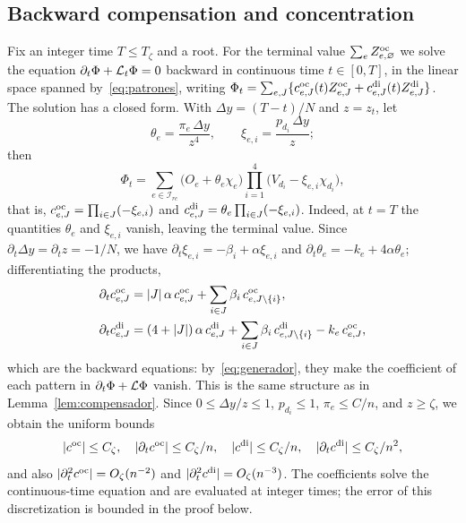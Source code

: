\subsection{Backward compensation and concentration}

Fix an integer time $T\le T_\zeta$ and a root. For the terminal value $\sum_eZ^{\mathrm{oc}}_{e,\varnothing}$ we solve
the equation
$\partial_t\Phi+\mathcal{L}_t\Phi=0$ backward in continuous time $t\in[0,T]$, in the linear space spanned
by~\eqref{eq:patrones}, writing
$\Phi_t=\sum_{e,J}\{c^{\mathrm{oc}}_{e,J}(t)Z^{\mathrm{oc}}_{e,J}+c^{\mathrm{di}}_{e,J}(t)Z^{\mathrm{di}}_{e,J}\}$. The solution has a closed form.
With $\Delta y=(T-t)/N$
and $z=z_t$, let \[
 \theta_e=\frac{\pi_e\,\Delta y}{z^4},\qquad \xi_{e,i}=\frac{p_{d_i}\,\Delta y}{z};
\] then \begin{equation}\label{eq:compensador_directo}
 \Phi_t=\sum_{e\in\mathcal I_{rc}}\bigl(O_e+\theta_e\chi_e\bigr)
 \prod_{i=1}^4\bigl(V_{d_i}-\xi_{e,i}\chi_{d_i}\bigr),
\end{equation} that is, $c^{\mathrm{oc}}_{e,J}=\prod_{i\in J}(-\xi_{e,i})$ and
$c^{\mathrm{di}}_{e,J}=\theta_e\prod_{i\in J}(-\xi_{e,i})$. Indeed, at
$t=T$ the quantities $\theta_e$ and $\xi_{e,i}$ vanish, leaving the terminal value. Since
$\partial_t\Delta y=\partial_tz=-1/N$, we
have $\partial_t\xi_{e,i}=-\beta_i+\alpha\xi_{e,i}$ and $\partial_t\theta_e=-k_e+4\alpha\theta_e$;
differentiating the products, \[
\begin{aligned}
 \partial_tc^{\mathrm{oc}}_{e,J}&=|J|\,\alpha\,c^{\mathrm{oc}}_{e,J}+\sum_{i\in J}\beta_i\,c^{\mathrm{oc}}_{e,J\setminus\{i\}},\\
 \partial_tc^{\mathrm{di}}_{e,J}&=(4+|J|)\,\alpha\,c^{\mathrm{di}}_{e,J}+\sum_{i\in J}\beta_i\,c^{\mathrm{di}}_{e,J\setminus\{i\}}
 -k_e\,c^{\mathrm{oc}}_{e,J},
\end{aligned}
\] which are the backward equations: by~\eqref{eq:generador}, they make the coefficient of each pattern in
$\partial_t\Phi+\mathcal{L}\Phi$
vanish. This is the same structure as in Lemma~\ref{lem:compensador}. Since $0\le\Delta y/z\le1$,
$p_{d_i}\le1$, $\pi_e\le C/n$, and
$z\ge\zeta$, we obtain the uniform bounds \begin{equation}\label{eq:coeficientes}
 |c^{\mathrm{oc}}|\le C_\zeta,\quad |\partial_tc^{\mathrm{oc}}|\le C_\zeta/n,\quad |c^{\mathrm{di}}|\le C_\zeta/n,\quad
 |\partial_tc^{\mathrm{di}}|\le C_\zeta/n^2,
\end{equation} and also $|\partial_t^2c^{\mathrm{oc}}|=O_\zeta(n^{-2})$ and $|\partial_t^2c^{\mathrm{di}}|=O_\zeta(n^{-3})$. The
coefficients solve the
continuous-time equation and are evaluated at integer times; the error of this discretization is bounded in
the proof below.

